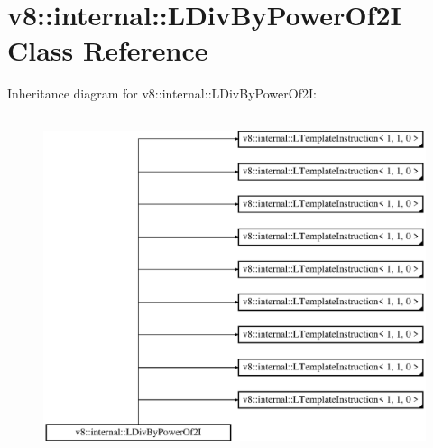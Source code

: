 \hypertarget{classv8_1_1internal_1_1_l_div_by_power_of2_i}{}\section{v8\+:\+:internal\+:\+:L\+Div\+By\+Power\+Of2I Class Reference}
\label{classv8_1_1internal_1_1_l_div_by_power_of2_i}
Inheritance diagram for v8\+:\+:internal\+:\+:L\+Div\+By\+Power\+Of2I\+:\begin{figure}[H]
\begin{center}
\leavevmode
\includegraphics[height=10.000000cm]{classv8_1_1internal_1_1_l_div_by_power_of2_i}
\end{center}
\end{figure}
